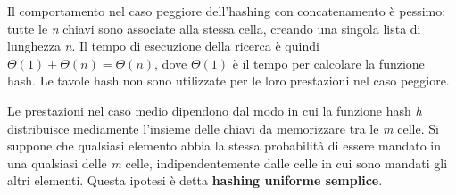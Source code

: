 \documentclass[10pt, a4paper]{report}
\begin{document}
Il comportamento nel caso peggiore dell'hashing con concatenamento è pessimo: tutte le \textit{n} chiavi sono associate alla stessa cella, creando una singola lista di lunghezza \textit{n}. Il tempo di esecuzione della ricerca è quindi $\Theta(1) + \Theta(n) = \Theta(n)$, dove $\Theta(1)$ è il tempo per calcolare la funzione hash. Le tavole hash non sono utilizzate per le loro prestazioni nel caso peggiore.

Le prestazioni nel caso medio dipendono dal modo in cui la funzione hash \textit{h} distribuisce mediamente l'insieme delle chiavi da memorizzare tra le \textit{m} celle. Si suppone che qualsiasi elemento abbia la stessa probabilità di essere mandato in una qualsiasi delle \textit{m} celle, indipendentemente dalle celle in cui sono mandati gli altri elementi. Questa ipotesi è detta \textbf{hashing uniforme semplice}.
\end{document}
